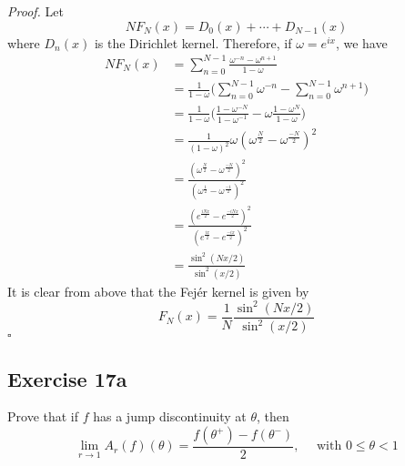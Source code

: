 \documentclass[12pt]{article}
\newenvironment{proof}{\textit{Proof.}}{\hfill$\square$}
\begin{document}
\vspace{2em}
\begin{proof}
    Let 
    \begin{equation*}
        NF_N(x)=D_0(x)+\cdots+D_{N-1}(x)
    \end{equation*}
    where $D_n(x)$ is the Dirichlet kernel. Therefore, if $\omega=e^{ix}$, we have
    \begin{align*}
        NF_N(x)&=\sum_{n=0}^{N-1}\frac{\omega^{-n}-\omega^{n+1}}{1-\omega} \\
        &=\frac{1}{1-\omega}\Big(\sum_{n=0}^{N-1}\omega^{-n}-\sum_{n=0}^{N-1}\omega^{n+1}\Big) \\
        &=\frac{1}{1-\omega}\Big(\frac{1-\omega^{-N}}{1-\omega^{-1}}-\omega\frac{1-\omega^N}{1-\omega}\Big) \\
        &=\frac{1}{(1-\omega)^2}\omega(\omega^\frac{N}{2}-\omega^\frac{-N}{2})^2 \\
        &=\frac{(\omega^\frac{N}{2}-\omega^\frac{-N}{2})^2}{(\omega^\frac{1}{2}-\omega^\frac{-1}{2})^2} \\
        &=\frac{(e^\frac{iNx}{2}-e^\frac{-iNx}{2})^2}{(e^\frac{ix}{2}-e^\frac{-ix}{2})^2} \\
        &=\frac{\sin^2(Nx/2)}{\sin^2(x/2)}
    \end{align*}
    It is clear from above that the Fejér kernel is given by
    \begin{equation*}
        F_N(x)=\frac{1}{N}\frac{\sin^2(Nx/2)}{\sin^2(x/2)}
    \end{equation*}
\end{proof}
\newpage

\subsection*{Exercise 17a}
Prove that if $f$ has a jump discontinuity at $\theta$, then
\begin{equation*}
    \lim_{r\to1}A_r(f)(\theta)=\frac{f(\theta^+)-f(\theta^-)}{2},\hspace{1em}\text{ with }0\le\theta<1
\end{equation*}
\end{document}
